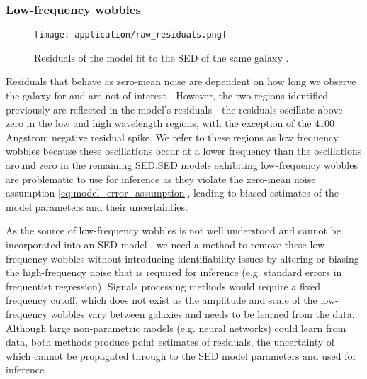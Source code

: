 \subsubsection{Low-frequency wobbles}
\begin{figure}[H]
    \texttt{[image: application/raw\_residuals.png]}
    \caption{Residuals of the model fit to the SED of the same galaxy \cite{galaxy-gp-noise}.}
\end{figure}
Residuals that behave as zero-mean noise are dependent on how long we observe the galaxy for and are not of interest \cite{galaxy-spectra-101}. However, the two regions identified previously are reflected in the model's residuals - the residuals oscillate above zero in the low and high wavelength regions, with the exception of the 4100 Angstrom negative residual spike. We refer to these regions as low frequency wobbles because these oscillations occur at a lower frequency than the oscillations around zero in the remaining SED.SED models exhibiting low-frequency wobbles are problematic to use for inference as they violate the zero-mean noise assumption \ref{eq:model_error_assumption}, leading to biased estimates of the model parameters and their uncertainties.


As the source of low-frequency wobbles is not well understood and cannot be incorporated into an SED model \cite{galaxy-spectra-101}, we need a method to remove these low-frequency wobbles without introducing identifiability issues by altering or biasing the high-frequency noise that is required for inference (e.g. standard errors in frequentist regression). Signals processing methods would require a fixed frequency cutoff, which does not exist as the amplitude and scale of the low-frequency wobbles vary between galaxies and needs to be learned from the data. Although large non-parametric models (e.g. neural networks) could learn from data, both methods produce point estimates of residuals, the uncertainty of which cannot be propagated through to the SED model parameters and used for inference.

